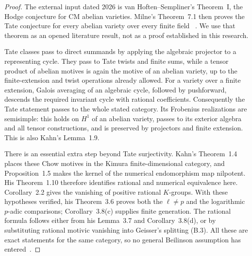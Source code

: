 \begin{proof}
The external input dated 2026 is van Hoften--Sempliner's
Theorem~I, the Hodge conjecture for CM abelian varieties.  Milne's
Theorem~7.1 then proves the Tate conjecture for every abelian variety
over every finite field~\cite[Theorem~I and \S1.1.3]{AvanHoftenSempliner2026}
\cite[Theorem~7.1]{AMilne1999}.  We use that theorem as an opened
literature result, not as a proof established in this research.

Tate classes pass to direct summands by applying the algebraic
projector to a representing cycle.  They pass to Tate twists and
finite sums, while a tensor product of abelian motives is again the
motive of an abelian variety, up to the finite-extension and twist
operations already allowed.  For a variety over a finite extension,
Galois averaging of an algebraic cycle, followed by pushforward,
descends the required invariant cycle with rational coefficients.
Consequently the Tate statement passes to the whole stated category.
Its Frobenius realizations are semisimple: this holds on \(H^1\)
of an abelian variety, passes to its exterior algebra and all tensor
constructions, and is preserved by projectors and finite extension.
This is also Kahn's Lemma~1.9.

There is an essential extra step beyond Tate surjectivity.  Kahn's
Theorem~1.4 places these Chow motives in the Kimura finite-dimensional
category, and Proposition~1.5 makes the kernel of the numerical
endomorphism map nilpotent.  His Theorem~1.10 therefore identifies
rational and numerical equivalence here.  Corollary~2.2 gives the
vanishing of positive rational \(K\)-groups.  With these hypotheses
verified, his Theorem~3.6 proves both the \(\ell\ne p\) and
the logarithmic \(p\)-adic comparisons; Corollary~3.8(c) supplies
finite generation.  The rational formula follows either from his
Lemma~3.7 and Corollary~3.8(d), or by substituting rational
motivic vanishing into Geisser's splitting (B.3).
All these are exact statements for the same category, so no general
Beilinson assumption has entered~\cite[Theorem~1.10, Corollary~2.2,
Theorem~3.6, Corollary~3.8]{BKahn2003}.
\end{proof}

